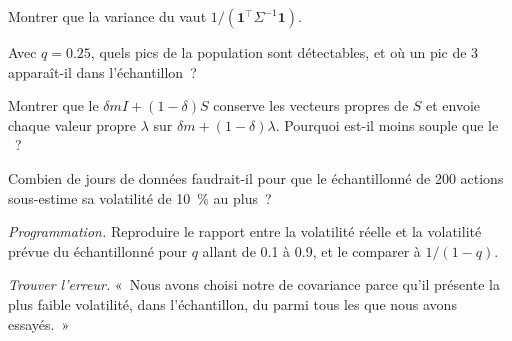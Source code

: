 \begin{exercise}[$\star$]\label{exo:qm:covariance-estimation-and-random-matrices:3}
Montrer que la variance du  vaut $1/(\mathbf 1^\top\Sigma^{-1}\mathbf 1)$.
\end{exercise}

\begin{exercise}[$\star\star$]\label{exo:qm:covariance-estimation-and-random-matrices:4}
Avec $q = 0.25$, quels pics de la population sont détectables, et où un pic de 3 apparaît-il dans l'échantillon~?
\end{exercise}

\begin{exercise}[$\star\star$]\label{exo:qm:covariance-estimation-and-random-matrices:5}
Montrer que le  $\delta mI + (1 - \delta)S$ conserve les vecteurs propres de $S$ et envoie chaque valeur propre $\lambda$ sur $\delta m + (1 - \delta)\lambda$. Pourquoi est-il moins souple que le
~?
\end{exercise}

\begin{exercise}[$\star\star$]\label{exo:qm:covariance-estimation-and-random-matrices:6}
Combien de jours de données faudrait-il pour que le  échantillonné de 200 actions sous-estime sa volatilité de 10~\% au plus~?
\end{exercise}

\begin{exercise}[$\star\star\star$]\label{exo:qm:covariance-estimation-and-random-matrices:7}
\emph{Programmation.} Reproduire le rapport entre la volatilité réelle et la volatilité prévue du  échantillonné pour $q$ allant de 0.1 à 0.9, et le comparer à $1/(1 - q)$.
\end{exercise}

\begin{exercise}[$\star\star\star$]\label{exo:qm:covariance-estimation-and-random-matrices:8}
\emph{Trouver l'erreur.} «~Nous avons choisi notre  de covariance parce qu'il présente la plus faible volatilité, dans l'échantillon, du  parmi tous les  que nous avons essayés.~»
\end{exercise}

